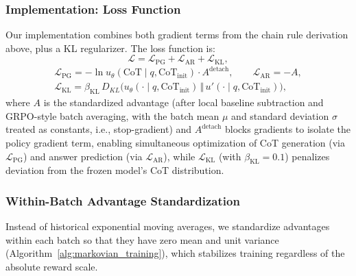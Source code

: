 \documentclass{article} %
\begin{document}
\subsubsection{Implementation: Loss Function}
\label{subsubsec:actor_rewards}
Our implementation combines both gradient terms from the chain rule derivation above, plus a KL regularizer. The loss function is:
\[\mathcal{L}=\mathcal{L}_{\text{PG}}+\mathcal{L}_{\text{AR}}+\mathcal{L}_{\text{KL}},\]
\begin{gather*}
\mathcal{L}_{\text{PG}}=-\ln u_\theta(\text{CoT} \mid q, \text{CoT}_{\text{init}})\cdot A^{\text{detach}},\qquad
\mathcal{L}_{\text{AR}}=-A,\\
\mathcal{L}_{\text{KL}}=\beta_{\text{KL}}\, D_{\!KL}\!\big(u_\theta(\cdot\mid q,\text{CoT}_{\text{init}})\,\Vert\,u'(\cdot\mid q,\text{CoT}_{\text{init}})\big),
\end{gather*}
where $A$ is the standardized advantage (after local baseline subtraction and GRPO-style batch averaging, with the batch mean $\mu$ and standard deviation $\sigma$ treated as constants, i.e., stop-gradient) and $A^{\text{detach}}$ blocks gradients to isolate the policy gradient term, enabling simultaneous optimization of CoT generation (via $\mathcal{L}_{\text{PG}}$) and answer prediction (via $\mathcal{L}_{\text{AR}}$), while $\mathcal{L}_{\text{KL}}$ (with $\beta_{\text{KL}}=0.1$) penalizes deviation from the frozen model's CoT distribution.

\subsubsection{Within-Batch Advantage Standardization}
Instead of historical exponential moving averages, we standardize advantages within each batch so that they have zero mean and unit variance (Algorithm~\ref{alg:markovian_training}), which stabilizes training regardless of the absolute reward scale.
\end{document}
